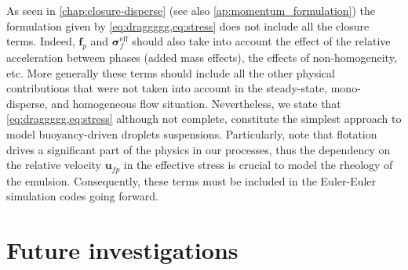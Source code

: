 As seen in \ref{chap:closure-disperse} (see also \ref{ap:momentum_formulation}) the formulation given by \ref{eq:draggggg,eq:stress} does not include all the closure terms. 
Indeed, $\textbf{f}_p$ and $\bm\sigma_f^\text{eff}$ should also take into account the effect of the relative acceleration between phases (added mass effects), the effects of non-homogeneity, etc.
More generally these terms should include all the other physical contributions that were not taken into account in the steady-state, mono-disperse, and homogeneous flow situation. 
Nevertheless, we state that \ref{eq:draggggg,eq:stress} although not complete, constitute the simplest approach to model buoyancy-driven droplets suspensions. 
Particularly, note that flotation drives a significant part of the physics in our processes, thus the dependency on the relative velocity $\textbf{u}_{fp}$ in the effective stress is crucial to model the rheology of the emulsion.
Consequently, these terms must be included in the Euler-Euler simulation codes going forward.


\chapter*{Future investigations}


